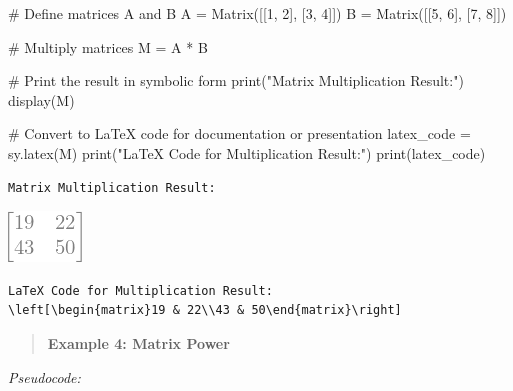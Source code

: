 \documentclass[
  letterpaper,
  DIV=11,
  numbers=noendperiod]{scrreprt}
\newenvironment{Shaded}{\begin{snugshade}}{\end{snugshade}}
\newcommand{\BuiltInTok}[1]{\textcolor[rgb]{0.00,0.23,0.31}{#1}}
\newcommand{\CommentTok}[1]{\textcolor[rgb]{0.37,0.37,0.37}{#1}}
\newcommand{\DecValTok}[1]{\textcolor[rgb]{0.68,0.00,0.00}{#1}}
\newcommand{\NormalTok}[1]{\textcolor[rgb]{0.00,0.23,0.31}{#1}}
\newcommand{\OperatorTok}[1]{\textcolor[rgb]{0.37,0.37,0.37}{#1}}
\newcommand{\StringTok}[1]{\textcolor[rgb]{0.13,0.47,0.30}{#1}}
\theoremstyle{plain}
\theoremstyle{definition}
\theoremstyle{remark}
\begin{document}
\begin{Shaded}
\begin{Highlighting}[]
\CommentTok{\# Define matrices A and B}
\NormalTok{A }\OperatorTok{=}\NormalTok{ Matrix([[}\DecValTok{1}\NormalTok{, }\DecValTok{2}\NormalTok{], [}\DecValTok{3}\NormalTok{, }\DecValTok{4}\NormalTok{]])}
\NormalTok{B }\OperatorTok{=}\NormalTok{ Matrix([[}\DecValTok{5}\NormalTok{, }\DecValTok{6}\NormalTok{], [}\DecValTok{7}\NormalTok{, }\DecValTok{8}\NormalTok{]])}

\CommentTok{\# Multiply matrices}
\NormalTok{M }\OperatorTok{=}\NormalTok{ A }\OperatorTok{*}\NormalTok{ B}

\CommentTok{\# Print the result in symbolic form}
\BuiltInTok{print}\NormalTok{(}\StringTok{"Matrix Multiplication Result:"}\NormalTok{)}
\NormalTok{display(M)}

\CommentTok{\# Convert to LaTeX code for documentation or presentation}
\NormalTok{latex\_code }\OperatorTok{=}\NormalTok{ sy.latex(M)}
\BuiltInTok{print}\NormalTok{(}\StringTok{"LaTeX Code for Multiplication Result:"}\NormalTok{)}
\BuiltInTok{print}\NormalTok{(latex\_code)}
\end{Highlighting}
\end{Shaded}

\begin{verbatim}
Matrix Multiplication Result:
\end{verbatim}

\includegraphics{module_1_files/figure-pdf/cell-6-output-2.png}

\begin{verbatim}
LaTeX Code for Multiplication Result:
\left[\begin{matrix}19 & 22\\43 & 50\end{matrix}\right]
\end{verbatim}

\begin{quote}
\textbf{Example 4: Matrix Power}
\end{quote}

\emph{Pseudocode:}
\end{document}
